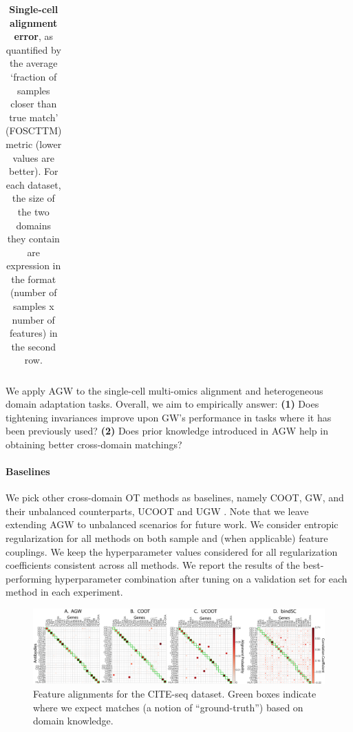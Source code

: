 \begin{table}[t]
\begin{center}
{\begin{tabular}{lccccccc}
\end{tabular}}
\end{center}
\caption{\label{table:scCells} \textbf{Single-cell alignment error},
as quantified by the average `fraction of samples closer than true match'
(FOSCTTM) metric (lower values are better).
For each dataset, the size of the two domains they contain are expression in the format
(number of samples x number of features) in the second row.
}
\end{table}

We apply AGW to the single-cell multi-omics alignment and heterogeneous domain adaptation tasks.
Overall, we aim to empirically answer:
\textbf{(1)} Does tightening invariances improve upon GW's performance in tasks where
it has been previously used? \textbf{(2)} Does prior knowledge introduced in AGW help
in obtaining better cross-domain matchings?

\paragraph{Baselines} We pick other cross-domain OT methods as baselines, namely COOT, GW,
and their unbalanced counterparts, UCOOT \citep{Tran23} and UGW \citep{Sejourne20}.
Note that we leave extending AGW to unbalanced scenarios for future work.
We consider entropic regularization for all methods on both sample and
(when applicable) feature couplings. We keep the hyperparameter values considered
for all regularization coefficients consistent across all methods. We report the results of
the best-performing hyperparameter combination after tuning on a validation set for each method
in each experiment.

\begin{figure}[t]
\centering
\includegraphics[width=\linewidth]{./Chapitre5/fig/cite_fgcoot_final.pdf}
\caption[Feature alignments for the CITE-seq dataset]{\label{fig:cite} Feature alignments for the CITE-seq dataset. Green boxes indicate
where we expect matches (a notion of ``ground-truth'') based on domain knowledge.}
\end{figure}

